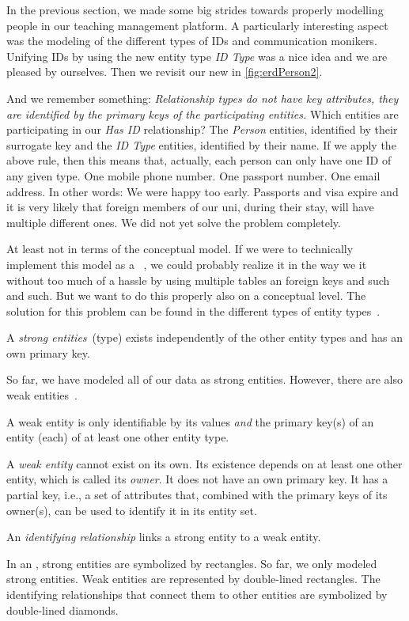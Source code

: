 %
%
\label{sec:weakEntities}%
%
In the previous section, we made some big strides towards properly modelling people in our teaching management platform.
A particularly interesting aspect was the modeling of the different types of IDs and communication monikers.
Unifying IDs by using the new entity type \emph{ID Type} was a nice idea and we are pleased by ourselves.
Then we revisit our new  in \cref{fig:erdPerson2}.

And we remember something:
\emph{Relationship types do not have key attributes, they are identified by the primary keys of the participating entities.}
Which entities are participating in our \emph{Has ID} relationship?
The \emph{Person} entities, identified by their surrogate key and the \emph{ID Type} entities, identified by their name.
If we apply the above rule, then this means that, actually, each person can only have one ID of any given type.
One mobile phone number.
One passport number.
One email address.
In other words:
We were happy too early.
Passports and visa expire and it is very likely that foreign members of our uni, during their stay, will have multiple different ones.
We did not yet solve the problem completely.

At least not in terms of the conceptual model.
If we were to technically implement this model as a \postgresql\ \db, we could probably realize it in the way we  it without too much of a hassle by using multiple tables an foreign keys and such and such.
But we want to do this properly also on a conceptual level.
The solution for this problem can be found in the different types of entity types~\cite{S2024D:CDMERDE}.%
%
\begin{definition}%
A \emph{strong entities}~(type) exists independently of the other entity types and has an own primary key.%
\end{definition}%
%
So far, we have modeled all of our data as strong entities.
However, there are also weak entities~\cite{P2006CITRD:CERDTRM,SS2005EIDDDFDB:CDDICAMP,S2024D:CDMERDE}.%
%
\begin{definition}%
A weak entity is only identifiable by its values \emph{and} the primary key(s) of an entity (each) of at least one other entity type.%
\end{definition}%
%
A \emph{weak entity} cannot exist on its own.
Its existence depends on at least one other entity, which is called its \emph{owner}.
It does not have an own primary key.
It has a partial key, i.e., a set of attributes that, combined with the primary keys of its owner(s), can be used to identify it in its entity set.%
%
\begin{definition}%
An \emph{identifying relationship} links a strong entity to a weak entity.%
\end{definition}%
%
In an , strong entities are symbolized by rectangles.
So far, we only modeled strong entities.
Weak entities are represented by double-lined rectangles.
The identifying relationships that connect them to other entities are symbolized by double-lined diamonds.

